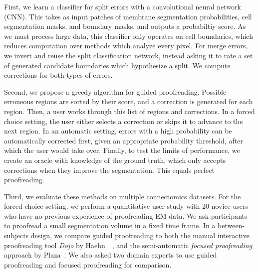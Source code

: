 First, we learn a classifier for split errors with a convolutional neural network (CNN). This takes as input patches of membrane segmentation probabilities, cell segmentation masks, and boundary masks, and outputs a probabiltiy score. As we must process large data, this classifier only operates on cell boundaries, which reduces computation over methods which analyze every pixel. For merge errors, we invert and reuse the split classification network, instead asking it to rate a set of generated candidate boundaries which hypothesize a split. We compute corrections for both types of errors.

Second, we propose a greedy algorithm for guided proofreading. Possible erroneous regions are sorted by their score, and a correction is generated for each region. Then, a user works through this list of regions and corrections. In a forced choice setting, the user either selects a correction or skips it to advance to the next region. In an automatic setting, errors with a high probability can be automatically corrected first, given an appropriate probability threshold, after which the user would take over. Finally, to test the limits of performance, we create an oracle with knowledge of the ground truth, which only accepts corrections when they improve the segmentation. This equals perfect proofreading.

Third, we evaluate these methods on multiple connectomics datasets. For the forced choice setting, we perform a quantitative user study with 20 novice users who have no previous experience of proofreading EM data. We ask participants to proofread a small segmentation volume in a fixed time frame. In a between-subjects design, we compare guided proofreading to both the manual interactive proofreading tool \textit{Dojo} by Haehn~\etal~\cite{haehn_dojo_2014}, and the semi-automatic \textit{focused proofreading} approach by Plaza~\cite{focused_proofreading}. We also asked two domain experts to use guided proofreading and focused proofreading for comparison.

